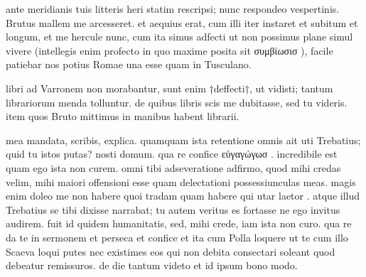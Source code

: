


 ante meridianis tuis litteris heri statim rescripsi; nunc respondeo vespertinis. Brutus mallem me arcesseret. et aequius erat, cum illi iter instaret et subitum et longum, et me hercule nunc, cum ita simus adfecti ut non possimus plane simul vivere (intellegis enim profecto in quo maxime posita sit συμβίωσισ ), facile patiebar nos potius Romae una esse quam in Tusculano.

 libri ad Varronem non morabantur, sunt enim †deffecti†, ut vidisti; tantum librariorum menda tolluntur. de quibus libris scis me dubitasse, sed tu videris. item quos Bruto mittimus in manibus habent librarii.

 mea mandata, scribis, explica. quamquam ista retentione omnis ait uti Trebatius; quid tu istos putas? nosti domum. qua re confice εὐγαγώγωσ . incredibile est quam ego ista non curem. omni tibi adseveratione adfirmo, quod mihi credas velim, mihi maiori offensioni esse quam delectationi possessiunculas meas. magis enim doleo me non habere quoi tradam quam habere qui utar laetor . atque illud Trebatius se tibi dixisse narrabat; tu autem veritus es fortasse ne ego invitus audirem. fuit id quidem humanitatis, sed, mihi crede, iam ista non curo. qua re da te in sermonem et perseca et confice et ita cum Polla loquere ut te cum illo Scaeva loqui putes nec existimes eos qui non debita consectari soleant quod debeatur remissuros. de die tantum videto et id ipsum bono modo.
